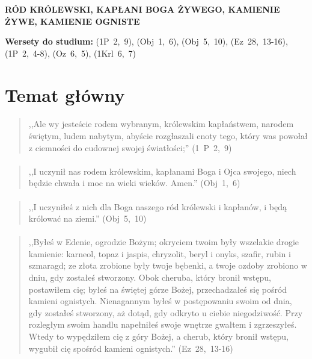 \documentclass[10pt,a4paper,oneside]{article}
\begin{document}
\centerline{\textbf{\MakeUppercase{Ród Królewski, Kapłani Boga Żywego, Kamienie Żywe, Kamienie Ogniste}}}
\begin{center}
\textbf{Wersety do studium:} \mbox{(1P 2, 9)}, \mbox{(Obj 1, 6)}, \mbox{(Obj 5, 10)}, \mbox{(Ez 28, 13-16)}, \mbox{(1P 2, 4-8)}, \mbox{(Oz 6, 5)}, \mbox{(1Krl 6, 7)}
\end{center}
\section{Temat główny}
\paragraph{}
\begin{quote}
,,Ale wy jesteście rodem wybranym, królewskim kapłaństwem, narodem świętym, ludem nabytym, abyście rozgłaszali cnoty tego, który was powołał z ciemności do cudownej swojej światłości;'' \mbox{(1 P 2, 9)}
\end{quote}
\paragraph{}
\begin{quote}
,,I uczynił nas rodem królewskim, kapłanami Boga i Ojca swojego, niech będzie chwała i moc na wieki wieków. Amen.'' \mbox{(Obj 1, 6)}
\end{quote}
\paragraph{}
\begin{quote}
,,I uczyniłeś z nich dla Boga naszego ród królewski i kapłanów, i będą królować na ziemi.'' \mbox{(Obj 5, 10)}
\end{quote}
\paragraph{}
\begin{quote}
,,Byłeś w Edenie, ogrodzie Bożym; okryciem twoim były wszelakie drogie kamienie: karneol, topaz i jaspis, chryzolit, beryl i onyks, szafir, rubin i szmaragd; ze złota zrobione były twoje bębenki, a twoje ozdoby zrobiono w dniu, gdy zostałeś stworzony. Obok cheruba, który bronił wstępu, postawiłem cię; byłeś na świętej górze Bożej, przechadzałeś się pośród kamieni ognistych. Nienagannym byłeś w postępowaniu swoim od dnia, gdy zostałeś stworzony, aż dotąd, gdy odkryto u ciebie niegodziwość. Przy rozległym swoim handlu napełniłeś swoje wnętrze gwałtem i zgrzeszyłeś. Wtedy to wypędziłem cię z góry Bożej, a cherub, który bronił wstępu, wygubił cię spośród kamieni ognistych.'' \mbox{(Ez 28, 13-16)}
\end{quote}
\end{document}

